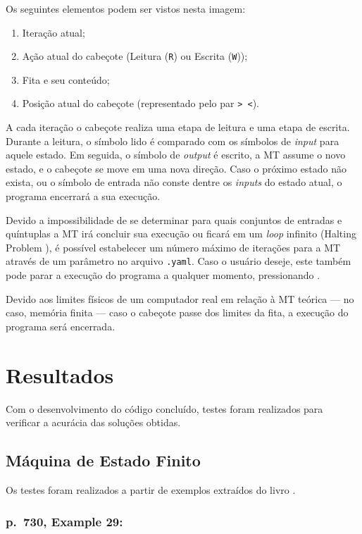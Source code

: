 Os seguintes elementos podem ser vistos nesta imagem:

\begin{enumerate}
    \item Iteração atual;
    \item Ação atual do cabeçote (Leitura (\verb|R|) ou Escrita (\verb|W|));
    \item Fita e seu conteúdo;
    \item Posição atual do cabeçote (representado pelo par \verb|> <|).
\end{enumerate}

A cada iteração o cabeçote realiza uma etapa de leitura e uma etapa de escrita.
Durante a leitura, o símbolo lido é comparado com os símbolos de \textit{input}
para aquele estado. Em seguida, o símbolo de \textit{output} é escrito, a MT
assume o novo estado, e o cabeçote se move em uma nova direção. Caso o próximo
estado não exista, ou o símbolo de entrada não conste dentre os \textit{inputs}
do estado atual, o programa encerrará a sua execução.

Devido a impossibilidade de se determinar para quais conjuntos de entradas e
quíntuplas a MT irá concluir sua execução ou ficará em um \textit{loop} infinito
(Halting Problem \cite{turing}), é possível estabelecer um número máximo de
iterações para a MT através de um parâmetro no arquivo \verb|.yaml|. Caso o
usuário deseje, este também pode parar a execução do programa a qualquer
momento, pressionando \linebreak {}.

Devido aos limites físicos de um computador real em relação à MT teórica --- no
caso, memória finita --- caso o cabeçote passe dos limites da fita, a execução
do programa será encerrada.

\section{Resultados}

Com o desenvolvimento do código concluído, testes foram realizados para
verificar a acurácia das soluções obtidas.

\subsection{Máquina de Estado Finito}

Os testes foram realizados a partir de exemplos extraídos do livro
\cite[cap.\ 9.3]{judith}.

\subsubsection*{p.\ 730, Example 29:}

